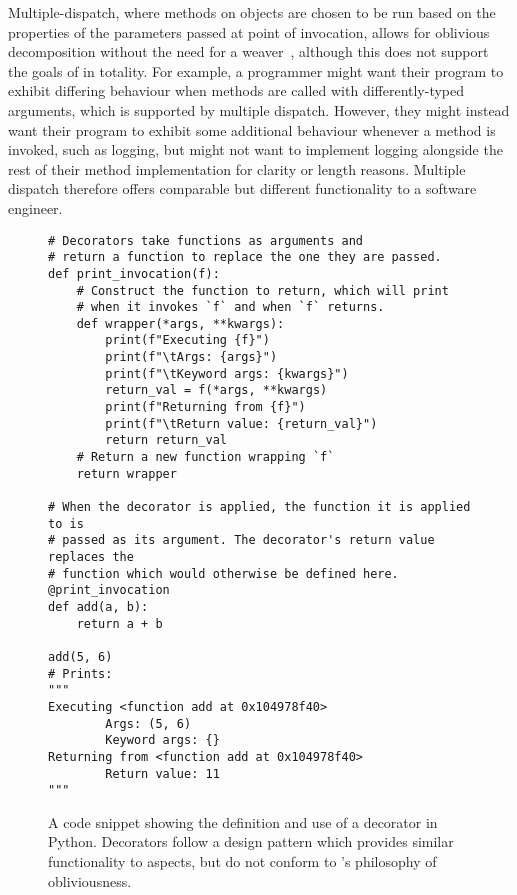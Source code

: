 Multiple-dispatch, where methods on objects are chosen to be run based on the
properties of the parameters passed at point of invocation, allows for oblivious
decomposition without the need for a weaver~\cite{dozsa2008lisp}, although this
does not support the goals of \aspectorientation{} in totality. For example, a
programmer might want their program to exhibit differing behaviour when methods
are called with differently-typed arguments, which is supported by multiple
dispatch. However, they might instead want their program to exhibit some
additional behaviour whenever a method is invoked, such as logging, but might
not want to implement logging alongside the rest of their method implementation
for clarity or length reasons. Multiple dispatch therefore offers comparable but
different functionality to a software engineer.

\begin{figure}
  \begin{lstlisting}[style=footnotesize_python]
# Decorators take functions as arguments and
# return a function to replace the one they are passed.
def print_invocation(f):
    # Construct the function to return, which will print
    # when it invokes `f` and when `f` returns.
    def wrapper(*args, **kwargs):
        print(f"Executing {f}")
        print(f"\tArgs: {args}")
        print(f"\tKeyword args: {kwargs}")
        return_val = f(*args, **kwargs)
        print(f"Returning from {f}")
        print(f"\tReturn value: {return_val}")
        return return_val
    # Return a new function wrapping `f`
    return wrapper 
  
# When the decorator is applied, the function it is applied to is
# passed as its argument. The decorator's return value replaces the
# function which would otherwise be defined here.
@print_invocation
def add(a, b):
    return a + b
    
add(5, 6)
# Prints:
"""
Executing <function add at 0x104978f40>
        Args: (5, 6)
        Keyword args: {}
Returning from <function add at 0x104978f40>
        Return value: 11
"""
  \end{lstlisting}
  \caption{A code snippet showing the definition and use of a decorator in
  Python. Decorators follow a design pattern which provides similar
  functionality to aspects, but do not conform to \aop{}'s philosophy of obliviousness.}
  \label{fig:decorator_code_snippet}
\end{figure}

